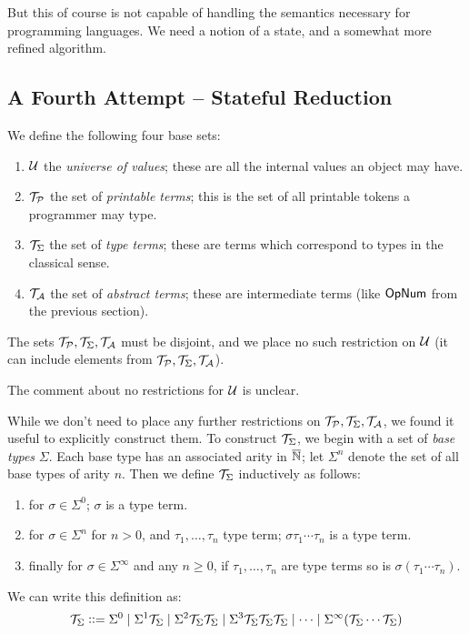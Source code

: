 \documentclass{llncs}
\newcounter{algo}
\newcommand{\yoni}[1]{{\begin{mdframed}[linecolor=red]{\color{red}#1}\end{mdframed}}}
\begin{document}
But this of course is not capable of handling the semantics necessary for programming languages.
We need a notion of a state, and a somewhat more refined algorithm.

\subsection{A Fourth Attempt -- Stateful Reduction}

We define the following four base sets:
\begin{enumerate}
    \item $\mathcal U$ the \textit{universe of values}; these are all the internal values an object may have.
    \item $\mathcal T_{\mathcal P}$ the set of \textit{printable terms}; this is the set of all printable tokens a programmer may type.
    \item $\mathcal T_{\Sigma}$ the set of \textit{type terms}; these are terms which correspond to types in the classical sense.
    \item $\mathcal T_{\mathcal A}$ the set of \textit{abstract terms}; these are intermediate terms (like $\mathsf{Op}\mathsf{Num}$ from the previous section).
\end{enumerate}
The sets $\mathcal T_{\mathcal P},\mathcal T_{\Sigma},\mathcal T_{\mathcal A}$ must be disjoint, and we place no such restriction on $\mathcal U$ (it can include elements from $\mathcal T_{\mathcal P},\mathcal T_{\Sigma},\mathcal T_{\mathcal A}$).
\yoni{The comment about no restrictions for $\mathcal U$ is unclear.}

While we don't need to place any further restrictions on $\mathcal T_{\mathcal P},\mathcal T_{\Sigma},\mathcal T_{\mathcal A}$, we found it useful to explicitly construct them.
To construct $\mathcal T_{\Sigma}$, we begin with a set of \textit{base types} $\Sigma$.
Each base type has an associated arity in $\overline{\mathbb N}$; let $\Sigma^n$ denote the set of all base types of arity $n$.
Then we define $\mathcal T_{\Sigma}$ inductively as follows:
\begin{enumerate}
    \item for $\sigma\in\Sigma^0$; $\sigma$ is a type term.
    \item for $\sigma\in\Sigma^n$ for $n>0$, and $\tau_1,\dots,\tau_n$ type term; $\sigma\tau_1\cdots\tau_n$ is a type term.
    \item finally for $\sigma\in\Sigma^\infty$ and any $n\geq0$, if $\tau_1,\dots,\tau_n$ are type terms so is $\sigma(\tau_1\cdots\tau_n)$.
\end{enumerate}
We can write this definition as:
\[ \mathcal T_{\Sigma} \mathrel{{\mathop:}{\mathop:}{=}} \Sigma^0 \mid \Sigma^1\mathcal T_{\Sigma} \mid \Sigma^2\mathcal T_{\Sigma}\mathcal T_{\Sigma} \mid \Sigma^3\mathcal T_{\Sigma}\mathcal T_{\Sigma}\mathcal T_{\Sigma} \mid \cdots \mid \Sigma^\infty(\mathcal T_{\Sigma}\cdots\mathcal T_{\Sigma}) \]
\end{document}
